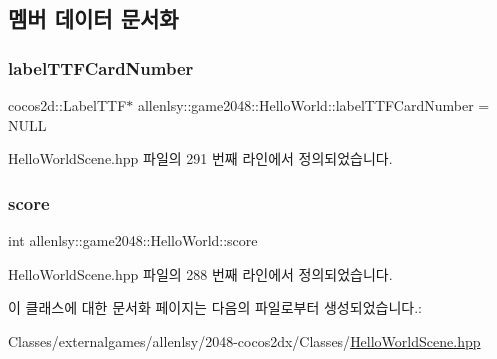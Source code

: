 \subsection{멤버 데이터 문서화}
\mbox{\label{classallenlsy_1_1game2048_1_1_hello_world_a08dbd0e2c7f6c6ac01f47e157d3b3911}} 
\subsubsection{\texorpdfstring{label\+T\+T\+F\+Card\+Number}{labelTTFCardNumber}}
{\footnotesize\ttfamily cocos2d\+::\+Label\+T\+TF$\ast$ allenlsy\+::game2048\+::\+Hello\+World\+::label\+T\+T\+F\+Card\+Number = N\+U\+LL}



Hello\+World\+Scene.\+hpp 파일의 291 번째 라인에서 정의되었습니다.

\mbox{\label{classallenlsy_1_1game2048_1_1_hello_world_af5e35e78792c3fe4a2d4ab6266e9c6e1}} 
\subsubsection{\texorpdfstring{score}{score}}
{\footnotesize\ttfamily int allenlsy\+::game2048\+::\+Hello\+World\+::score}



Hello\+World\+Scene.\+hpp 파일의 288 번째 라인에서 정의되었습니다.



이 클래스에 대한 문서화 페이지는 다음의 파일로부터 생성되었습니다.\+:\begin{DoxyCompactItemize}
\item 
Classes/externalgames/allenlsy/2048-\/cocos2dx/\+Classes/\hyperlink{_hello_world_scene_8hpp}{Hello\+World\+Scene.\+hpp}\end{DoxyCompactItemize}
